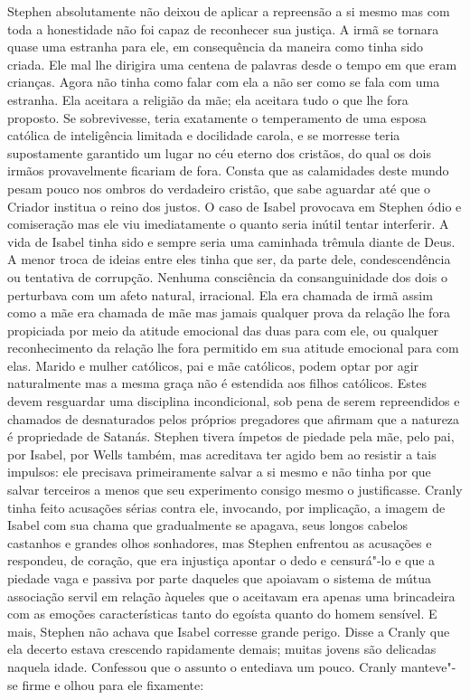 Stephen absolutamente não deixou de aplicar a repreensão a si mesmo mas com
toda a honestidade não foi capaz de reconhecer sua justiça.  A irmã se tornara
quase uma estranha para ele, em consequência da maneira como tinha sido criada.
Ele mal lhe dirigira uma centena de palavras desde o tempo em que eram
crianças.  Agora não tinha como falar com ela a não ser como se fala com uma
estranha.  Ela aceitara a religião da mãe; ela aceitara tudo o que lhe fora
proposto.  Se sobrevivesse, teria exatamente o temperamento de uma esposa
católica de inteligência limitada e docilidade carola, e se morresse teria
supostamente garantido um lugar no céu eterno dos cristãos, do qual os dois
irmãos provavelmente ficariam de fora.  Consta que as calamidades deste mundo
pesam pouco nos ombros do verdadeiro cristão, que sabe aguardar até que o
Criador institua o reino dos justos.  O caso de Isabel provocava em Stephen
ódio e comiseração mas ele viu imediatamente o quanto seria inútil tentar
interferir.  A vida de Isabel tinha sido e sempre seria uma caminhada trêmula
diante de Deus.  A menor troca de ideias entre eles tinha que ser, da parte
dele, condescendência ou tentativa de corrupção.  Nenhuma consciência da
consanguinidade dos dois o perturbava com um afeto natural, irracional.  Ela
era chamada de irmã assim como a mãe era chamada de mãe mas jamais qualquer
prova da relação lhe fora propiciada por meio da atitude emocional das duas
para com ele, ou qualquer reconhecimento da relação lhe fora permitido em sua
atitude emocional para com elas.  Marido e mulher católicos, pai e mãe
católicos, podem optar por agir naturalmente mas a mesma graça não é estendida
aos filhos católicos.  Estes devem resguardar uma disciplina incondicional, sob
pena de serem repreendidos e chamados de desnaturados pelos próprios pregadores
que \label{afirmam"-que} afirmam que a natureza é \mbox{propriedade} de Satanás.  Stephen tivera ímpetos
de piedade pela mãe, pelo pai, por Isabel, por Wells também, mas acreditava ter
agido bem ao resistir a tais impulsos: ele precisava primeiramente salvar a si
mesmo e não tinha por que salvar terceiros a menos que seu experimento consigo
mesmo o justificasse.  Cranly tinha feito acusações sérias contra ele,
invocando, por implicação, a imagem de Isabel com sua chama que gradualmente se
apagava, seus longos cabelos castanhos e grandes olhos sonhadores, mas Stephen
enfrentou as acusações e respondeu, de coração, que era injustiça apontar o
dedo e censurá"-lo e que a piedade vaga e passiva por parte daqueles que
apoiavam o sistema de mútua associação servil em relação àqueles que o
aceitavam era apenas uma brincadeira com as emoções características tanto do
egoísta quanto do homem sensível.  E mais, Stephen não achava que Isabel
corresse grande perigo.  Disse a Cranly que ela decerto estava crescendo
rapidamente demais; muitas jovens são delicadas naquela idade.  Confessou que o
assunto o entediava um pouco.  Cranly manteve"-se firme e olhou para ele
fixamente:

